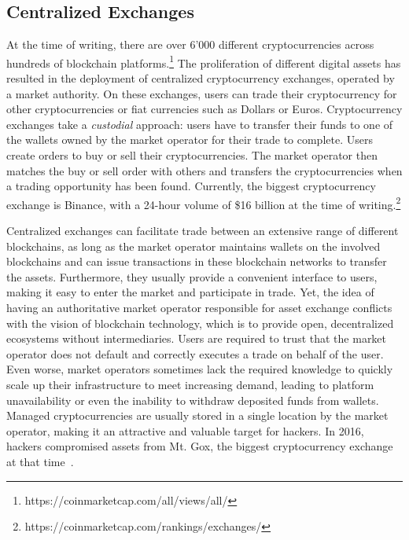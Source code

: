 \subsection{Centralized Exchanges}
At the time of writing, there are over 6'000 different cryptocurrencies across hundreds of blockchain platforms.\footnote{https://coinmarketcap.com/all/views/all/}
The proliferation of different digital assets has resulted in the deployment of centralized cryptocurrency exchanges, operated by a market authority.
On these exchanges, users can trade their cryptocurrency for other cryptocurrencies or fiat currencies such as Dollars or Euros.
Cryptocurrency exchanges take a \emph{custodial} approach: users have to transfer their funds to one of the wallets owned by the market operator for their trade to complete.
Users create orders to buy or sell their cryptocurrencies.
The market operator then matches the buy or sell order with others and transfers the cryptocurrencies when a trading opportunity has been found.
Currently, the biggest cryptocurrency exchange is Binance, with a 24-hour volume of \$16 billion at the time of writing.\footnote{https://coinmarketcap.com/rankings/exchanges/}

Centralized exchanges can facilitate trade between an extensive range of different blockchains, as long as the market operator maintains wallets on the involved blockchains and can issue transactions in these blockchain networks to transfer the assets.
Furthermore, they usually provide a convenient interface to users, making it easy to enter the market and participate in trade.
Yet, the idea of having an authoritative market operator responsible for asset exchange conflicts with the vision of blockchain technology, which is to provide open, decentralized ecosystems without intermediaries.
Users are required to trust that the market operator does not default and correctly executes a trade on behalf of the user.
Even worse, market operators sometimes lack the required knowledge to quickly scale up their infrastructure to meet increasing demand, leading to platform unavailability or even the inability to withdraw deposited funds from wallets.
Managed cryptocurrencies are usually stored in a single location by the market operator, making it an attractive and valuable target for hackers.
In 2016, hackers compromised assets from Mt. Gox, the biggest cryptocurrency exchange at that time~\cite{trautman2014virtual}.

